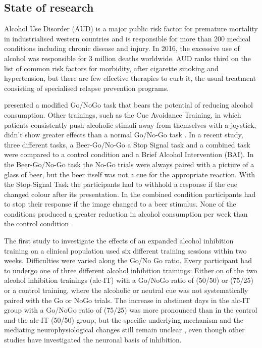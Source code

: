 \documentclass[12pt]{article}
\begin{document}
\subsection{State of research}
Alcohol Use Disorder (AUD) is a major public risk factor for premature mortality in industrialised western countries and is responsible for more than 200 medical conditions including chronic disease and injury. In 2016, the excessive use of alcohol was responsible for 3 million deaths worldwide. AUD ranks third on the list of common risk factors for morbidity, after cigarette smoking and hypertension, but there are few effective therapies to curb it, the usual treatment consisting of specialised relapse prevention programs. 

\textcite{houbenBeerNogoLearning2012} presented a modified Go/NoGo task that bears the potential of reducing alcohol consumption. Other trainings, such as the Cue Avoidance Training, in which patients consistently push alcoholic stimuli away from themselves with a joystick, didn’t show greater effects than a normal Go/No-Go task \parencite{dilemmaCueAvoidanceTraining2017}. In a recent study, three different tasks, a Beer-Go/No-Go a Stop Signal task and a combined task were compared to a control condition and a Brief Alcohol Intervention (BAI). In the Beer-Go/No-Go task the No-Go trials were always paired with a picture of a glass of beer, but the beer itself was not a cue for the appropriate reaction. With the Stop-Signal Task the participants had to withhold a response if the cue changed colour after its presentation. In the combined condition participants had to stop their response if the image changed to a beer stimulus. None of the conditions produced a greater reduction in alcohol consumption per week than the control condition \parencite{smithCurrentFormsInhibitory2017}. 

The first study to investigate the effects of an expanded alcohol inhibition training on a clinical population used six different training sessions within two weeks. Difficulties were varied along the Go/No Go ratio. Every participant had to undergo one of three different alcohol inhibition trainings: Either on of the two alcohol inhibition trainings (alc-IT) with a Go/NoGo ratio of (50/50) or (75/25) or a control training, where the alcoholic or neutral cue was not systematically paired with the Go or NoGo trials. The increase in abstinent days in the alc-IT group with a Go/NoGo ratio of (75/25) was more pronounced than in the control and the alc-IT (50/50) group, but the specific underlying mechanism and the mediating neurophysiological changes still remain unclear \parencite{tschuemperlinLearningResistUrge2019}, even though other studies have investigated the neuronal basis of inhibition.
\end{document}
